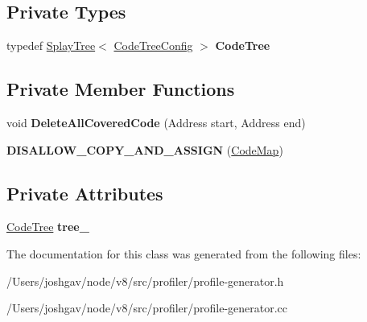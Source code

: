 \subsection*{Private Types}
\begin{DoxyCompactItemize}
\item 
typedef \hyperlink{classv8_1_1internal_1_1_splay_tree}{Splay\+Tree}$<$ \hyperlink{structv8_1_1internal_1_1_code_map_1_1_code_tree_config}{Code\+Tree\+Config} $>$ {\bfseries Code\+Tree}\hypertarget{classv8_1_1internal_1_1_code_map_a9e10acbc6e370c10412cb2ab9a21f007}{}\label{classv8_1_1internal_1_1_code_map_a9e10acbc6e370c10412cb2ab9a21f007}

\end{DoxyCompactItemize}
\subsection*{Private Member Functions}
\begin{DoxyCompactItemize}
\item 
void {\bfseries Delete\+All\+Covered\+Code} (Address start, Address end)\hypertarget{classv8_1_1internal_1_1_code_map_a02d1686c41d4f9e667f74f1872643311}{}\label{classv8_1_1internal_1_1_code_map_a02d1686c41d4f9e667f74f1872643311}

\item 
{\bfseries D\+I\+S\+A\+L\+L\+O\+W\+\_\+\+C\+O\+P\+Y\+\_\+\+A\+N\+D\+\_\+\+A\+S\+S\+I\+GN} (\hyperlink{classv8_1_1internal_1_1_code_map}{Code\+Map})\hypertarget{classv8_1_1internal_1_1_code_map_a076a068a71dd59c94e18953ff83fad2b}{}\label{classv8_1_1internal_1_1_code_map_a076a068a71dd59c94e18953ff83fad2b}

\end{DoxyCompactItemize}
\subsection*{Private Attributes}
\begin{DoxyCompactItemize}
\item 
\hyperlink{classv8_1_1internal_1_1_splay_tree}{Code\+Tree} {\bfseries tree\+\_\+}\hypertarget{classv8_1_1internal_1_1_code_map_ab9820ebd4c3d8845c56d603385a72aaa}{}\label{classv8_1_1internal_1_1_code_map_ab9820ebd4c3d8845c56d603385a72aaa}

\end{DoxyCompactItemize}


The documentation for this class was generated from the following files\+:\begin{DoxyCompactItemize}
\item 
/\+Users/joshgav/node/v8/src/profiler/profile-\/generator.\+h\item 
/\+Users/joshgav/node/v8/src/profiler/profile-\/generator.\+cc\end{DoxyCompactItemize}
